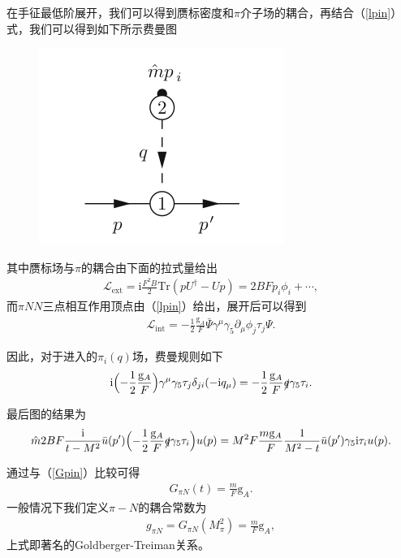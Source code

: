 \documentclass[aps,tightenlines,16pt]{ctexart}
\numberwithin{equation}{section}
\newcommand{\mL}{\mathcal{L}}
\begin{document}
在手征最低阶展开，我们可以得到赝标密度和$\pi$介子场的耦合，再结合（\ref{lpin}）式，我们可以得到如下所示费曼图
\begin{figure}[h]
   \centering
   \includegraphics[scale=0.4]{pspin.png}
\end{figure}
其中赝标场与$\pi$的耦合由下面的拉式量给出
\begin{align}
   \mL_{\text{ext}}=\mbox{i}\frac{F^2B}{2}\text{Tr}(pU^{\dagger}-Up)=2BFp_i\phi_i+\cdots,
\end{align}
而$\pi NN$三点相互作用顶点由（\ref{lpin}）给出，展开后可以得到
\begin{align}
   \mL_{\text{int}}=-\frac{1}{2}\frac{\mathrm{g}_A}{F}\bar{\Psi}\gamma^{\mu}\gamma_5\partial_{\mu}\phi_j\tau_j\Psi.
\end{align}

因此，对于进入的$\pi_{i}(q)$场，费曼规则如下
\begin{align}{
   \mbox{i}\Bigl(-\frac{1}{2}\frac{\mathrm{g}_A}{F}\Bigr)\gamma^{\mu}\gamma_5\tau_j\delta_{ji}(-\mbox{i}q_{\mu})}=-\frac{1}{2}\frac{\mathrm{g}_A}{F}\slashed{q}\gamma_5\tau_i.
\end{align}

最后图的结果为
\begin{align}
   \hat{m}2BF\frac{\mbox{i}}{t-M^2}\bar{u}(p^{\prime})\Bigl(-\frac{1}{2}\frac{\mathrm{g}_A}{F}\slashed{q}\gamma_5\tau_i\Bigr)u(p)=M^2F\frac{m\mathrm{g}_A}{F}\frac{1}{M^2-t}\bar{u}(p^{\prime})\gamma_5\mbox{i}\tau_iu(p).
\end{align}

通过与（\ref{Gpin}）比较可得
\begin{align}
   G_{\pi N}(t)=\frac{m}{F}\mathrm{g}_A.
\end{align}
一般情况下我们定义$\pi-N$的耦合常数为
\begin{align}
   g_{\pi N}=G_{\pi N}(M_{\pi}^2)=\frac{m}{F}\mathrm{g}_A,
\end{align}
上式即著名的Goldberger-Treiman关系。
\end{document}
